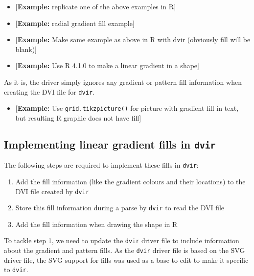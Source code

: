 \documentclass[]{article}
\providecommand{\tightlist}{%
  \setlength{\itemsep}{0pt}\setlength{\parskip}{0pt}}
\begin{document}
\begin{itemize}
\item
  {[}\textbf{Example:} replicate one of the above examples in R{]}
\item
  {[}\textbf{Example:} \Tikz{} radial gradient fill example{]}
\item
  {[}\textbf{Example:} Make same \Tikz{} example as above in R with dvir
  (obviously fill will be blank){]}
\item
  {[}\textbf{Example:} Use R 4.1.0 to make a linear gradient in a
  shape{]}
\end{itemize}

As it is, the \Tikz{} driver simply ignores any gradient or pattern fill
information when creating the DVI file for \texttt{dvir}.

\begin{itemize}
\tightlist
\item
  {[}\textbf{Example:} Use \texttt{grid.tikzpicture()} for picture with
  gradient fill in text, but resulting R graphic does not have fill{]}
\end{itemize}

\subsection{\texorpdfstring{Implementing \Tikz{} linear gradient fills
in
\texttt{dvir}\label{tikzWorkflow}}{Implementing  linear gradient fills in dvir}}\label{implementing-linear-gradient-fills-in-dvir}

The following steps are required to implement these \Tikz{} fills in
\texttt{dvir}:

\begin{enumerate}
\def\labelenumi{\arabic{enumi}.}
\item
  Add the fill information (like the gradient colours and their
  locations) to the DVI file created by \texttt{dvir}
\item
  Store this fill information during a parse by \texttt{dvir} to read
  the DVI file
\item
  Add the fill information when drawing the shape in R
\end{enumerate}

To tackle step 1, we need to update the \texttt{dvir} \Tikz{} driver
file to include information about the gradient and pattern fills. As the
\texttt{dvir} \Tikz{} driver file is based on the SVG \Tikz{} driver
file, the SVG support for \Tikz{} fills was used as a base to edit to
make it specific to \texttt{dvir}.
\end{document}
